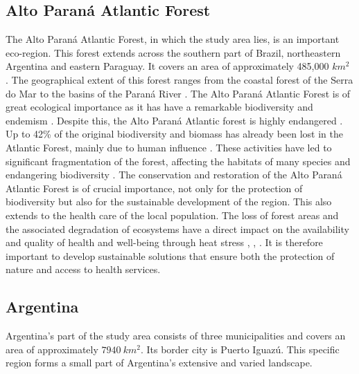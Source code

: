 \documentclass[11pt, a4paper]{report}
\begin{document}
\subsection{Alto Paraná Atlantic Forest}
The Alto Paraná Atlantic Forest, in which the study area lies, is an important eco-region. This forest extends across the southern part of Brazil, northeastern Argentina and eastern Paraguay. It covers an area of approximately 485,000 $km^2$ \citep{schipper_alto_2018}. The geographical extent of this forest ranges from the coastal forest of the Serra do Mar to the basins of the Paraná River \citep{schipper_alto_2018}. The Alto Paraná Atlantic Forest is of great ecological importance as it has have a remarkable biodiversity and endemism  \citep{de_lima_erosion_2020}. Despite this, the Alto Paraná Atlantic forest is highly endangered \citep{de_lima_erosion_2020}. Up to 42\% of the original biodiversity and biomass has already been lost in the Atlantic Forest, mainly due to human influence \citep{de_lima_erosion_2020}. These activities have led to significant fragmentation of the forest, affecting the habitats of many species and endangering biodiversity \citep{gennerich_land-use_2024}.
The conservation and restoration of the Alto Paraná Atlantic Forest is of crucial importance, not only for the protection of biodiversity but also for the sustainable development of the region. This also extends to the health care of the local population. The loss of forest areas and the associated degradation of ecosystems have a direct impact on the availability and quality of health and well-being through heat stress \citep{palmer_no_2022}, \citep{hedin_connecting_2022}, \citep{deivanayagam_breaking_2023}. It is therefore important to develop sustainable solutions that ensure both the protection of nature and access to health services. 

\subsection{Argentina}
Argentina's part of the study area consists of three municipalities and covers an area of approximately $7940 \ km^2$. Its border city is Puerto Iguazú. This specific region forms a small part of Argentina's extensive and varied landscape.
\end{document}
